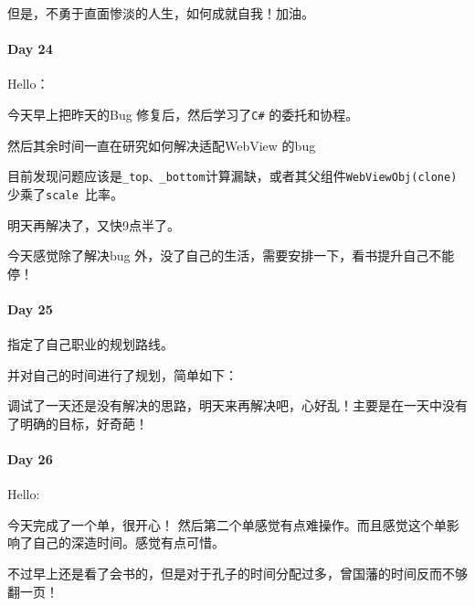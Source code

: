 \documentclass[UTF8,a4paper,8pt]{ctexart}
\begin{document}
 	 	但是，不勇于直面惨淡的人生，如何成就自我！加油。
 	 \paragraph{Day 24      \quad     }
 	 	Hello：
 	 	
 	 	今天早上把昨天的Bug 修复后，然后学习了\verb|C#| 的委托和协程。
 	 	
 	 	然后其余时间一直在研究如何解决适配WebView 的bug
 	 	
 	 	目前发现问题应该是\verb|_top、_bottom|计算漏缺，或者其父组件\verb|WebViewObj(clone) |少乘了\verb|scale |比率。
 	 	
 	 	明天再解决了，又快9点半了。
 	 	
 	 	今天感觉除了解决bug 外，没了自己的生活，需要安排一下，看书提升自己不能停！
 	 \paragraph{Day 25      \quad     }
 	 	指定了自己职业的规划路线。
 	 	
  		
  	 并对自己的时间进行了规划，简单如下：
   	
   		调试了一天还是没有解决的思路，明天来再解决吧，心好乱！主要是在一天中没有了明确的目标，好奇葩！
 	 \paragraph{Day 26      \quad     }
 	 	Hello:
 	 	
 	 	今天完成了一个单，很开心！ 然后第二个单感觉有点难操作。而且感觉这个单影响了自己的深造时间。感觉有点可惜。
 	 	
 	 	不过早上还是看了会书的，但是对于孔子的时间分配过多，曾国藩的时间反而不够翻一页！
 	 	
\end{document}
